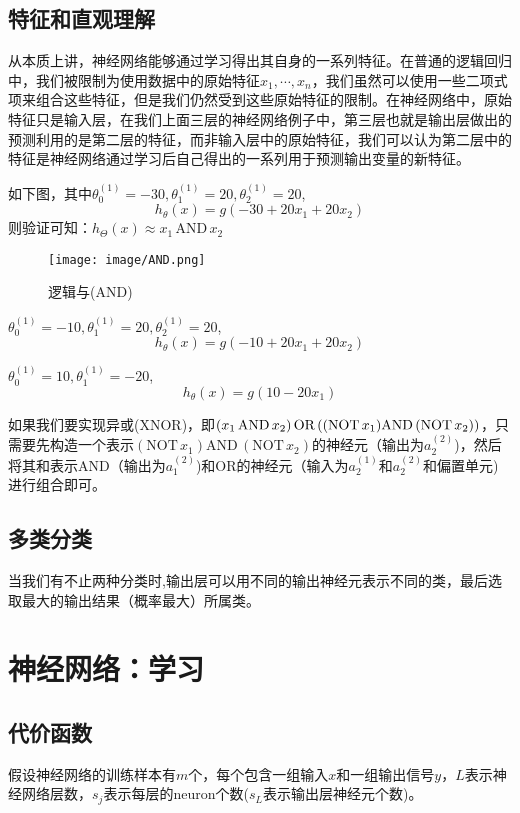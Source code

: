\documentclass[cn,hazy,blue,normal,14pt]{elegantnote}
\begin{document}
\subsection{特征和直观理解}
从本质上讲，神经网络能够通过学习得出其自身的一系列特征。在普通的逻辑回归中，我们被限制为使用数据中的原始特征$x_1,\cdots,x_n$，我们虽然可以使用一些二项式项来组合这些特征，但是我们仍然受到这些原始特征的限制。在神经网络中，原始特征只是输入层，在我们上面三层的神经网络例子中，第三层也就是输出层做出的预测利用的是第二层的特征，而非输入层中的原始特征，我们可以认为第二层中的特征是神经网络通过学习后自己得出的一系列用于预测输出变量的新特征。
\newpage
\begin{example}
如下图，其中$\theta_0 ^{(1)}=-30,\theta_1^{(1)}=20,\theta_2^{(1)}=20$,
$$
h_\theta(x)=g(-30+20x_1+20x_2)
$$
则验证可知：$h_\Theta(x)\approx x_1\,\text{AND}\, x_2$
\end{example}
\begin{figure}[H]
    \centering
    \texttt{[image: image/AND.png]}
    \caption{逻辑与(AND)}
\end{figure}
\begin{example}[逻辑或(OR)]
$\theta_0 ^{(1)}=-10,\theta_1^{(1)}=20,\theta_2^{(1)}=20$,
$$
h_\theta(x)=g(-10+20x_1+20x_2)
$$
\end{example}
\begin{example}
$\theta_0 ^{(1)}=10,\theta_1^{(1)}=-20$,
$$
h_\theta(x)=g(10-20x_1)
$$
\end{example}

如果我们要实现异或(XNOR)，即$(x_1\,\text{AND}\, x_2)\, \text{OR} \, ((\text{NOT} \,x_1)\text{AND} \\ \,(\text{{NOT}} \, x_2))$，只需要先构造一个表示$(\text{NOT} \,x_1)\text{AND}\,(\text{{NOT}} \, x_2)$的神经元（输出为$a_2^{(2)}$)，然后将其和表示AND（输出为$a_1^{(2)}$)和OR的神经元（输入为$a_2^{(1)}$和$a_2^{(2)}$和偏置单元)进行组合即可。
\subsection{多类分类}
当我们有不止两种分类时,输出层可以用不同的输出神经元表示不同的类，最后选取最大的输出结果（概率最大）所属类。
\section{神经网络：学习}
\subsection{代价函数}
假设神经网络的训练样本有$m$个，每个包含一组输入$x$和一组输出信号$y$，$L$表示神经网络层数，$s_j$表示每层的neuron个数($s_L$表示输出层神经元个数)。
\end{document}
